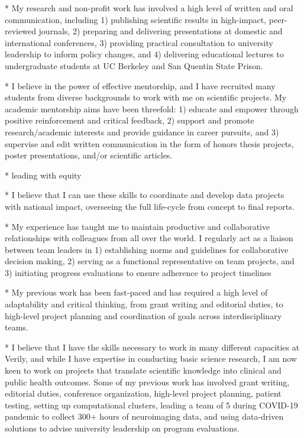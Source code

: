 \documentclass[9pt, a4paper]{maedbh-cv}
\begin{document}
\begin{cvletter}
* My research and non-profit work has involved a high level of written and oral communication, including 1) publishing scientific results in high-impact, peer-reviewed journals, 2) preparing and delivering presentations at domestic and international conferences, 3) providing practical consultation to university leadership to inform policy changes, and 4) delivering educational lectures to undergraduate students at UC Berkeley and San Quentin State Prison. 

* I believe in the power of effective mentorship, and I have recruited many students from diverse backgrounds to work with me on scientific projects. My academic mentorship aims have been threefold: 1) educate and empower through positive reinforcement and critical feedback, 2) support and promote research/academic interests and provide guidance in career pursuits, and 3) supervise and edit written communication in the form of honors thesis projects, poster presentations, and/or scientific articles.

* leading with equity

* I believe that I can use these skills to coordinate and develop data projects with national impact, overseeing the full life-cycle from concept to final reports.

* My experience has taught me to maintain productive and collaborative relationships with colleagues from all over the world. I regularly act as a liaison between team leaders in 1) establishing norms and guidelines for collaborative decision making, 2) serving as a functional representative on team projects, and 3) initiating progress evaluations to ensure adherence to project timelines

* My previous work has been fast-paced and has required a high level of adaptability and critical thinking, from grant writing and editorial duties, to high-level project planning and coordination of goals across interdisciplinary teams.

*  I believe that I have the skills necessary to work in many different capacities at Verily, and while I have expertise in conducting basic science research, I am now keen to work on projects that translate scientific knowledge into clinical and public health outcomes. Some of my previous work has involved grant writing, editorial duties, conference organization, high-level project planning, patient testing, setting up computational clusters, leading a team of 5 during COVID-19 pandemic to collect 300+ hours of neuroimaging data, and using data-driven solutions to advise university leadership on program evaluations. 


\end{cvletter}
\end{document}
